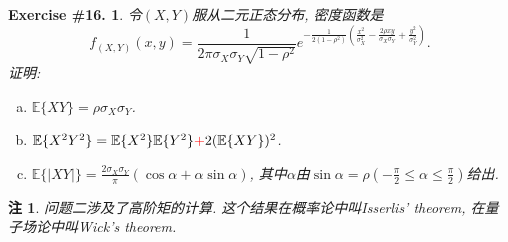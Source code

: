 \documentclass[UTF8, a4paper]{article}
\newtheorem{exercise}{Exercise \#16.}
\newtheorem*{remark}{注}
\begin{document}
\begin{framed}
\begin{exercise}
令\((X,Y)\)服从二元正态分布, 密度函数是
$$
f_{(X, Y)}(x, y)=\frac{1}{2 \pi \sigma_X \sigma_Y \sqrt{1-\rho^2}} e^{-\frac{1}{2\left(1-\rho^2\right)}\left(\frac{x^2}{\sigma_X^2}-\frac{2 \rho x y}{\sigma_X \sigma_Y}+\frac{y^2}{\sigma_Y^2}\right)} .
$$
证明:
\begin{enumerate}[a)]
    \item \(\mathbb{E}\{XY\} = \rho \sigma_X \sigma_Y\).
    \item \(\mathbb{E}\{X^2Y^2\} = \mathbb{E}\{X^2\}\mathbb{E}\{Y^2\} {\color{red} + } 2 (\mathbb{E}\{XY\})^2\).
    \item \(\mathbb{E}\{|XY|\} = \frac{2\sigma_X \sigma_Y}{\pi}(\cos\alpha + \alpha \sin\alpha)\), 其中\(\alpha\)由\(\sin\alpha = \rho\left(-\frac{\pi}{2} \leq \alpha \leq \frac{\pi}{2}\right)\)给出.
\end{enumerate}
\end{exercise}
\end{framed}
\begin{remark}
问题二涉及了高阶矩的计算.
这个结果在概率论中叫Isserlis' theorem, 
在量子场论中叫Wick's theorem.
\end{remark}
\end{document}
